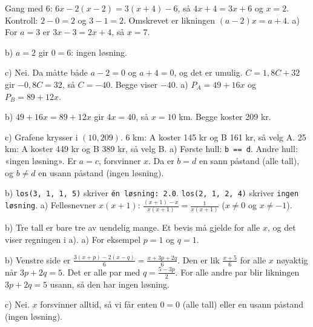  Gang med 6: $6x - 2(x-2) = 3(x+4) - 6$, så $4x + 4 = 3x + 6$ og $x = 2$. Kontroll: $2 - 0 = 2$ og $3 - 1 = 2$.
 Omskrevet er likningen $(a-2)x = a + 4$.
a) For $a = 3$ er $3x - 3 = 2x + 4$, så $x = 7$.\par
b) $a = 2$ gir $0 = 6$: ingen løsning.\par
c) Nei. Da måtte både $a - 2 = 0$ og $a + 4 = 0$, og det er umulig.
 $C = 1{,}8C + 32$ gir $-0{,}8C = 32$, så $C = -40$. Begge viser $-40$.
 a) $P_A = 49 + 16x$ og $P_B = 89 + 12x$.\par
b) $49 + 16x = 89 + 12x$ gir $4x = 40$, så $x = 10$ km. Begge koster 209 kr.\par
c) Grafene krysser i $(10, 209)$. 6 km: A koster 145 kr og B 161 kr, så velg A. 25 km: A koster 449 kr og B 389 kr, så velg B.
 a) Første hull: \lstinline[style=laereverk,numbers=none,frame=none]|b == d|. Andre hull: «ingen løsning». Er $a = c$, forsvinner $x$. Da er $b = d$ en sann påstand (alle tall), og $b \neq d$ en usann påstand (ingen løsning).\par
b) \lstinline[style=laereverk,numbers=none,frame=none]|los(3, 1, 1, 5)| skriver \lstinline[style=laereverk,numbers=none,frame=none]|én løsning: 2.0|. \lstinline[style=laereverk,numbers=none,frame=none]|los(2, 1, 2, 4)| skriver \lstinline[style=laereverk,numbers=none,frame=none]|ingen løsning|.
 a) Fellesnevner $x(x+1)$: $\frac{(x+1) - x}{x(x+1)} = \frac{1}{x(x+1)}$ ($x \neq 0$ og $x \neq -1$).\par
b) Tre tall er bare tre av uendelig mange. Et bevis må gjelde for alle $x$, og det viser regningen i a).
 a) For eksempel $p = 1$ og $q = 1$.\par
b) Venstre side er $\frac{3(x+p) - 2(x-q)}{6} = \frac{x + 3p + 2q}{6}$. Den er lik $\frac{x+5}{6}$ for alle $x$ nøyaktig når $3p + 2q = 5$. Det er alle par med $q = \frac{5-3p}{2}$. For alle andre par blir likningen $3p + 2q = 5$ usann, så den har ingen løsning.\par
c) Nei. $x$ forsvinner alltid, så vi får enten $0 = 0$ (alle tall) eller en usann påstand (ingen løsning).
